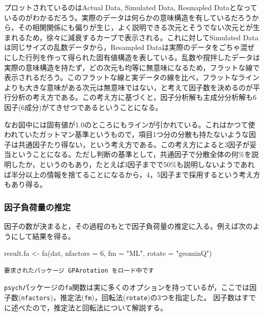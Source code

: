 \documentclass[
  a4paper,
]{ltjsbook}
\newenvironment{Shaded}{\begin{snugshade}}{\end{snugshade}}
\newcommand{\AttributeTok}[1]{\textcolor[rgb]{0.40,0.45,0.13}{#1}}
\newcommand{\DecValTok}[1]{\textcolor[rgb]{0.68,0.00,0.00}{#1}}
\newcommand{\FunctionTok}[1]{\textcolor[rgb]{0.28,0.35,0.67}{#1}}
\newcommand{\NormalTok}[1]{\textcolor[rgb]{0.00,0.23,0.31}{#1}}
\newcommand{\OtherTok}[1]{\textcolor[rgb]{0.00,0.23,0.31}{#1}}
\newcommand{\StringTok}[1]{\textcolor[rgb]{0.13,0.47,0.30}{#1}}
\begin{document}
プロットされているのはActual Data, Simulated Data, Resmapled
Dataとなっているのがわかるだろう。実際のデータは何らかの意味構造を有しているだろうから，その相関関係にも偏りが生じ，よく説明できる次元とそうでない次元とが生まれるため，徐々に減衰するカーブで表示される。これに対してSimulated
Dataは同じサイズの乱数データから，Resampled
Dataは実際のデータをごちゃ混ぜにした行列を作って得られた固有値構造を表している。乱数や撹拌したデータは実際の意味構造を持たず，どの次元も均等に無意味になるため，フラットな線で表示されるだろう。このフラットな線と実データの線を比べ，フラットなラインよりも大きな意味がある次元は無意味ではない，と考えて因子数を決めるのが平行分析の考え方である。この考え方に基づくと，因子分析解も主成分分析解も6因子(6成分)がてきせつであるということになる。

なお図中には固有値が1.0のところにもラインが引かれている。これはかつて使われていたガットマン基準というもので，項目1つ分の分散も持たないような因子は共通因子たり得ない，という考え方である。この考え方によると3因子が妥当ということになる。ただし判断の基準として，共通因子で分散全体の何\%を説明したか，というのもあり，たとえば3因子までで50\%も説明しないようであれば半分以上の情報を捨てることになるから，4，5因子まで採用するという考え方もあり得る。

\subsubsection{因子負荷量の推定}\label{ux56e0ux5b50ux8ca0ux8377ux91cfux306eux63a8ux5b9a}

因子の数が決まると，その過程のもとで因子負荷量の推定に入る。例えば次のようにして結果を得る。

\begin{Shaded}
\begin{Highlighting}[]
\NormalTok{result.fa }\OtherTok{\textless{}{-}} \FunctionTok{fa}\NormalTok{(dat, }\AttributeTok{nfactors =} \DecValTok{6}\NormalTok{, }\AttributeTok{fm =} \StringTok{"ML"}\NormalTok{, }\AttributeTok{rotate =} \StringTok{"geominQ"}\NormalTok{)}
\end{Highlighting}
\end{Shaded}

\begin{verbatim}
要求されたパッケージ GPArotation をロード中です
\end{verbatim}

\texttt{psych}パッケージの\texttt{fa}関数は実に多くのオプションを持っているが，ここでは因子数(\texttt{nfactors})，推定法(\texttt{fm})，回転法(\texttt{rotate})の3つを指定した。
因子数はすでに述べたので，推定法と回転法について解説する。
\end{document}
